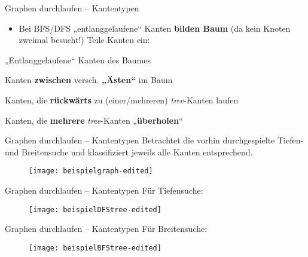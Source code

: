 \begin{frame}{Graphen durchlaufen – Kantentypen}
	\begin{itemize}
		\item Bei BFS/DFS „entlanggelaufene“ Kanten \textbf{bilden Baum} {\small (da kein Knoten zweimal besucht!)}
		\pause
		\implitem Teile Kanten ein:
	\end{itemize}
	\vspace{-\baselineskip}
	{\small \begin{description} 
			\setlength\itemsep{0pt} %
			\setlength\topsep{0pt} 
			\setlength\parskip{0pt}
		\item[\textbf{tree}-:] „Entlanggelaufene“ Kanten des Baumes
		\pause
		\item[\textbf{cross}-:] Kanten \textbf{zwischen} versch. \textbf{„Ästen“} im Baum
		\pause
		\item[\textbf{backward}-:] Kanten, die \textbf{rückwärts} zu (einer/mehreren) \emph{tree}-Kanten laufen
		\pause
		\item[\textbf{forward}-:] Kanten, die \textbf{mehrere} \emph{tree}-Kanten „\textbf{überholen}“
	\end{description}}
	\vspace{-.5\baselineskip}
	\centering
\end{frame}

\begin{frame}{Graphen durchlaufen – Kantentypen}
	Betrachtet die vorhin durchgespielte Tiefen- und Breitensuche und klassifiziert jeweils alle Kanten entsprechend. \vspace{-.2\baselineskip}
	\begin{figure}[htp]
		\centering
		\texttt{[image: beispielgraph-edited]}
	\end{figure}
\end{frame}

\begin{frame}{Graphen durchlaufen – Kantentypen}
	\solutionheading
	Für Tiefensuche: \\
	\vspace{-.3\baselineskip}
	\begin{figure}[htp]
		\centering
		\texttt{[image: beispielDFStree-edited]}
	\end{figure}
\end{frame}

\begin{frame}{Graphen durchlaufen – Kantentypen}
	\solutionheading
	Für Breitensuche:
	\vspace{-.3\baselineskip}
	\begin{figure}[htp]
		\centering
		\texttt{[image: beispielBFStree-edited]}
	\end{figure}
\end{frame}

